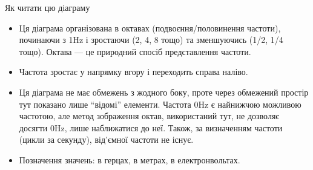 {
{\Large Як читати цю діаграму}
\begin{itemize}

\item Ця діаграма організована в октавах (подвоєння/половинення частоти), починаючи з 1Hz і зростаючи (2, 4, 8 тощо) та зменшуючись (1/2, 1/4 тощо). Октава --- це природний спосіб представлення частоти.

\item Частота зростає у напрямку вгору і переходить справа наліво.


\item Ця діаграма не має обмежень з жодного боку, проте через обмежений простір тут показано лише ``відомі'' елементи. Частота 0Hz є найнижчою можливою частотою, але метод зображення октав, використаний тут, не дозволяє досягти 0Hz, лише наближатися до неї. Також, за визначенням частоти (цикли за секунду), від'ємної частоти не існує.

\item Позначення значень: \psframebox[framesep=1pt,fillstyle=solid,fillcolor=Black]{\textcolor{FColor}{Частота}} в герцах,%
\psframebox[framesep=1pt,fillstyle=solid,fillcolor=Black]{\textcolor{WColor}{Довжина хвилі}} в метрах,%
\psframebox[framesep=1pt,fillstyle=solid,fillcolor=Black]{\textcolor{EColor}{Енергія}} в електронвольтах.

\end{itemize}
}
